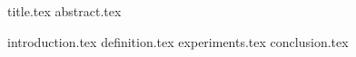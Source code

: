 \documentclass[11pt]{llncs}
\begin{document}
{title.tex}
\thispagestyle{plain}
{abstract.tex}

{introduction.tex}
{definition.tex}
{experiments.tex}
{conclusion.tex}



\end{document}

